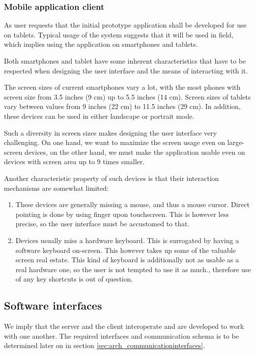 \documentclass[11pt]{book}
\begin{document}
\subsubsection{Mobile application client}\label{sec:req_webapplication_frontend}
As user requests that the initial prototype application shall be developed for use on tablets. Typical usage of the system suggests that it will be used in field, which implies using the application on smartphones and tablets.

Both smartphones and tablet have some inherent characteristics that have to be respected when designing the user interface and the means of interacting with it.

The screen sizes of current smartphones vary a lot, with the most phones with screen size from 3.5 inches (9 cm) up to 5.5 inches (14 cm). Screen sizes of tablets vary between values from 9 inches (22 cm) to 11.5 inches (29 cm). In addition, these devices can be used in either landscape or portrait mode.

Such a diversity in screen sizes makes designing the user interface very challenging. On one hand, we want to maximize the screen usage even on large-screen devices, on the other hand, we must make the application usable even on devices with screen area up to 9 times smaller.

Another characteristic property of such devices is that their interaction mechanisms are somewhat limited:

\begin{enumerate}
  \item These devices are generally missing a mouse, and thus a mouse cursor. Direct pointing is done by using finger upon touchscreen. This is however less precise, so the user interface must be accustomed to that.
  \item Devices usually miss a hardware keyboard. This is surrogated by having a software keyboard on-screen. This however takes up some of the valuable screen real estate. This kind of keyboard is additionally not as usable as a real hardware one, so the user is not tempted to use it as much., therefore use of any key shortcuts is out of question.
\end{enumerate}

\subsection{Software interfaces}
We imply that the server and the client interoperate and are developed to work with one another. The required interfaces and communication schema is to be determined later on in section \ref{sec:arch_communicationinterfaces}.
\end{document}
